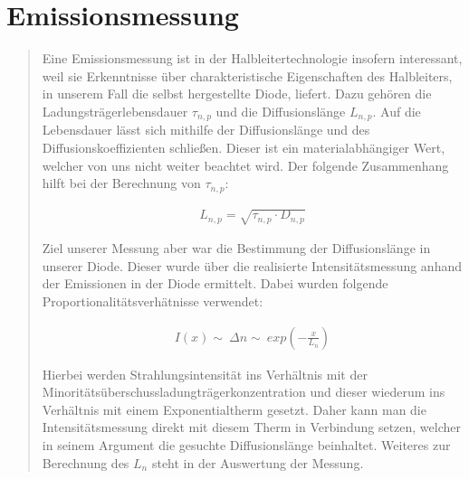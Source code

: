 
\section{Emissionsmessung}
\begin{quote}
    
    Eine Emissionsmessung ist in der Halbleitertechnologie insofern interessant,
    weil sie Erkenntnisse über charakteristische Eigenschaften des Halbleiters,
    in unserem Fall die selbst hergestellte Diode, liefert. Dazu gehören die
    Ladungsträgerlebensdauer $\tau_{n,p}$ und die Diffusionslänge $L_{n,p}$. Auf
    die Lebensdauer lässt sich mithilfe der Diffusionslänge und des
    Diffusionskoeffizienten schließen. Dieser ist ein materialabhängiger Wert,
    welcher von uns nicht weiter beachtet wird. Der folgende Zusammenhang hilft
    bei der Berechnung von $\tau_{n,p}$:
    
    \begin{equation*}
        \begin{split}
            L_{n,p} = \sqrt{\tau_{n,p} \cdot D_{n,p}} 
        \end{split}
    \end{equation*}
    
    Ziel unserer Messung aber war die Bestimmung der Diffusionslänge in unserer
    Diode. Dieser wurde über die realisierte Intensitätsmessung anhand der
    Emissionen in der Diode ermittelt. Dabei wurden folgende
    Proportionalitätsverhätnisse verwendet:
    
    \begin{equation*}
        \begin{split}
            I(x) \sim \ \Delta n \sim \ exp(-\frac{x}{L_n}) 
        \end{split}
    \end{equation*}
    
    Hierbei werden Strahlungsintensität ins Verhältnis mit der\\
    Minoritätsüberschussladungträgerkonzentration und dieser wiederum 
    ins Verhältnis mit einem Exponentialtherm gesetzt. Daher kann man die
    Intensitätsmessung direkt mit diesem Therm in Verbindung setzen, 
    welcher in seinem Argument die gesuchte Diffusionslänge beinhaltet. Weiteres
    zur Berechnung des $L_n$ steht in der Auswertung der Messung.\\
    

\end{quote}
